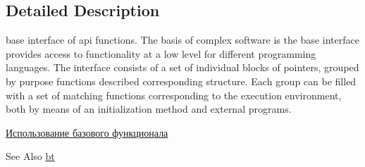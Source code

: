 \subsection{Detailed Description}
base interface of api functions. The basis of complex software is the base interface provides access to functionality at a low level for different programming languages. The interface consists of a set of individual blocks of pointers, grouped by purpose functions described corresponding structure. Each group can be filled with a set of matching functions corresponding to the execution environment, both by means of an initialization method and external programs.

\hyperlink{page2}{Использование базового функционала} \begin{DoxySeeAlso}{See Also}
\hyperlink{namespacebt}{bt} 
\end{DoxySeeAlso}



